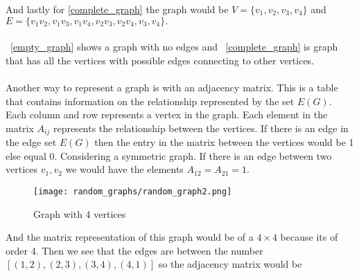 \documentclass[15pt, a4paper]{Assignment}
\begin{document}
And lastly for \ref{complete_graph} the graph would be $V = \{v_1, v_2, v_3, v_4\}$ and $E=\{v_1v_2,v_1v_3,v_1v_4,v_2v_3,v_2v_4,v_3,v_4\}.$\\\\
~\ref{empty_graph} shows a graph with no edges and ~\ref{complete_graph} is graph that has all the vertices with possible edges connecting to other vertices.
\\\\
Another way to represent a graph is with an adjacency matrix.
This is a table that contains information on the relationship represented by the set $ E(G)$.
Each column and row represents a vertex in the graph.
Each element in the matrix $A_{ij}$ represents the relationship between the vertices.
If there is an edge in the edge set $E(G)$ then the entry in the matrix between the vertices would be 1 else equal 0.
Considering a symmetric graph.
If there is an edge between two vertices $v_1 ,v_2$ we would have the elements $A_{12} = A_{21}=1$.
\begin{figure}[H]
	\centering
	\texttt{[image: random\_graphs/random\_graph2.png]}
	\caption{Graph with 4 vertices}
	\label{random_graph2}
\end{figure}
And the matrix representation of this graph would be of a $4\times 4$ because its of order 4.
Then we see that the edges are between the number $[(1,2), (2,3), (3,4), (4,1)]$ so the adjacency matrix would be
\end{document}
